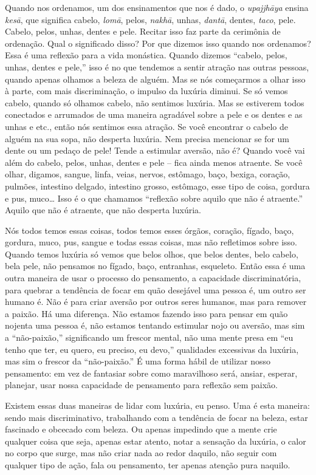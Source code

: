 Quando nos ordenamos, um dos ensinamentos que nos é dado, o
\emph{upajjhāya} ensina \emph{kesā}, que significa cabelo,
\emph{lomā}, pelos, \emph{nakhā}, unhas, \emph{dantā},
dentes, \emph{taco}, pele. Cabelo, pelos, unhas, dentes e pele.
Recitar isso faz parte da cerimônia de ordenação. Qual o significado
disso? Por que dizemos isso quando nos ordenamos? Essa é uma reflexão
para a vida monástica. Quando dizemos “cabelo, pelos, unhas, dentes e
pele,” isso é no que tendemos a sentir atração nas outras pessoas,
quando apenas olhamos a beleza de alguém. Mas se nós começarmos a olhar
isso à parte, com mais discriminação, o impulso da luxúria diminui. Se
só vemos cabelo, quando só olhamos cabelo, não sentimos luxúria. Mas se
estiverem todos conectados e arrumados de uma maneira agradável sobre a
pele e os dentes e as unhas e etc., então nós sentimos essa atração. Se
você encontrar o cabelo de alguém na sua sopa, não desperta luxúria.
Nem precisa mencionar se for um dente ou um pedaço de pele! Tende a
estimular aversão, não é? Quando você vai além do cabelo, pelos, unhas,
dentes e pele – fica ainda menos atraente. Se você olhar, digamos,
sangue, linfa, veias, nervos, estômago, baço, bexiga, coração, pulmões,
intestino delgado, intestino grosso, estômago, esse tipo de coisa,
gordura e pus, muco\ldots{} Isso é o que chamamos “reflexão sobre aquilo que
não é atraente.” Aquilo que não é atraente, que não desperta luxúria. 

Nós todos temos essas coisas, todos temos esses órgãos, coração,
fígado, baço, gordura, muco, pus, sangue e todas essas coisas, mas não
refletimos sobre isso. Quando temos luxúria só vemos que belos olhos,
que belos dentes, belo cabelo, bela pele, não pensamos no fígado, baço,
entranhas, esqueleto. Então essa é uma outra maneira de usar o processo
do pensamento, a capacidade discriminatória, para quebrar a tendência
de focar em quão desejável uma pessoa é, um outro ser humano é. Não é
para criar aversão por outros seres humanos, mas para remover a paixão.
Há uma diferença. Não estamos fazendo isso para pensar em quão nojenta
uma pessoa é, não estamos tentando estimular nojo ou aversão, mas sim a
“não-paixão,” significando um frescor mental, não uma mente presa em
“eu tenho que ter, eu quero, eu preciso, eu devo,” qualidades
excessivas da luxúria, mas sim o frescor da “não-paixão.” É uma forma
hábil de utilizar nosso pensamento: em vez de fantasiar sobre como
maravilhoso será, ansiar, esperar, planejar, usar nossa capacidade de
pensamento para reflexão sem paixão. 

Existem essas duas maneiras de lidar com luxúria, eu penso. Uma é
esta maneira: sendo mais discriminativo, trabalhando com a tendência de
focar na beleza, estar fascinado e obcecado com beleza. Ou apenas
impedindo que a mente crie qualquer coisa que seja, apenas estar
atento, notar a sensação da luxúria, o calor no corpo que surge, mas
não criar nada ao redor daquilo, não seguir com qualquer tipo de ação,
fala ou pensamento, ter apenas atenção pura naquilo.


